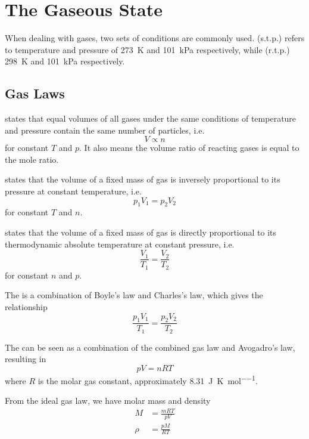 \documentclass[Chemistry.tex]{subfiles}
\begin{document}
\chapter{The Gaseous State}
When dealing with gases, two sets of conditions are commonly used.  (s.t.p.) refers to temperature and pressure of \SI{273}{\kelvin} and \SI{101}{\kilo\pascal} respectively, while  (r.t.p.) \SI{298}{\kelvin} and \SI{101}{\kilo\pascal} respectively.
\section{Gas Laws}
 states that equal volumes of all gases under the same conditions of temperature and pressure contain the same number of particles, i.e. \begin{equation}V \propto n\end{equation} for constant \(T\) and \(p\). It also means the volume ratio of reacting gases is equal to the mole ratio.

 states that the volume of a fixed mass of gas is inversely proportional to its pressure at constant temperature, i.e. \begin{equation}p_1V_1=p_2V_2\end{equation} for constant \(T\) and \(n\).

 states that the volume of a fixed mass of gas is directly proportional to its thermodynamic absolute temperature at constant pressure, i.e. \begin{equation}\frac{V_1}{T_1} = \frac{V_2}{T_2}\end{equation} for constant \(n\) and \(p\).

The  is a combination of Boyle's law and Charles's law, which gives the relationship \begin{equation}\frac{p_1V_1}{T_1} = \frac{p_2V_2}{T_2}\end{equation}

The  can be seen as a combination of the combined gas law and Avogadro's law, resulting in \begin{equation}pV = nRT\end{equation} where \(R\) is the molar gas constant, approximately \SI{8.31}{\joule\per\kelvin\per\mole}.

From the ideal gas law, we have molar mass and density \begin{align}M &= \frac{mRT}{pV}\\\rho &= \frac{pM}{RT}\end{align}
\end{document}
